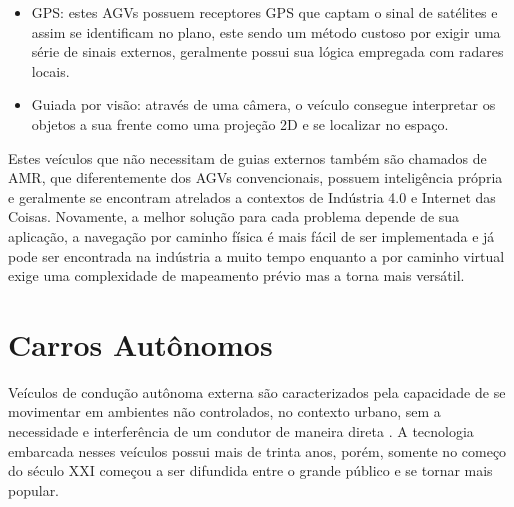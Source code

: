 \begin{itemize}
\begin{itemize}
                \item GPS: estes AGVs possuem receptores GPS que captam o sinal
                        de satélites e assim se identificam no plano, este
                        sendo um método custoso por exigir uma série de sinais
                        externos, geralmente possui sua lógica empregada com
                        radares locais.

                \item Guiada por visão: através de uma câmera, o veículo
                        consegue interpretar os objetos a sua frente como uma
                        projeção 2D e se localizar no espaço.

        \end{itemize}

\end{itemize}


Estes veículos que não necessitam de guias externos também são chamados de AMR,
que diferentemente dos AGVs convencionais, possuem inteligência própria e
geralmente se encontram atrelados a contextos de Indústria 4.0 e Internet das
Coisas. Novamente, a melhor solução para cada problema depende de sua
aplicação, a navegação por caminho física é mais fácil de ser implementada e já
pode ser encontrada na indústria a muito tempo enquanto a por caminho virtual
exige uma complexidade de mapeamento prévio mas a torna mais versátil.

\section{Carros Aut{\^o}nomos}

Veículos de condução autônoma externa são caracterizados pela capacidade de se
movimentar em ambientes não controlados, no contexto urbano, sem a necessidade
e interferência de um condutor de maneira direta \cite{usp2016}. A tecnologia
embarcada nesses veículos possui mais de trinta anos, porém, somente no começo
do século XXI começou a ser difundida entre o grande público e se tornar mais
popular.

